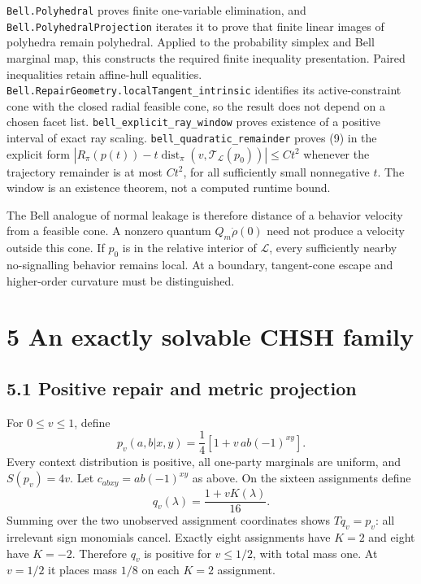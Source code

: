 \documentclass[
]{article}
\begin{document}
\texttt{Bell.Polyhedral} proves finite one-variable elimination, and \texttt{Bell.PolyhedralProjection} iterates it to prove that finite linear images of polyhedra remain polyhedral. Applied to the probability simplex and Bell marginal map, this constructs the required finite inequality presentation. Paired inequalities retain affine-hull equalities. \texttt{Bell.RepairGeometry.localTangent\_intrinsic} identifies its active-constraint cone with the closed radial feasible cone, so the result does not depend on a chosen facet list. \texttt{bell\_explicit\_ray\_window} proves existence of a positive interval of exact ray scaling. \texttt{bell\_quadratic\_remainder} proves (9) in the explicit form \(|R_\pi(p(t))-t\operatorname{dist}_\pi(v,\mathcal T_{\mathcal L}(p_0))|\le Ct^2\) whenever the trajectory remainder is at most \(Ct^2\), for all sufficiently small nonnegative \(t\). The window is an existence theorem, not a computed runtime bound.

The Bell analogue of normal leakage is therefore distance of a behavior velocity from a feasible cone. A nonzero quantum \(Q_m\dot\rho(0)\) need not produce a velocity outside this cone. If \(p_0\) is in the relative interior of \(\mathcal L\), every sufficiently nearby no-signalling behavior remains local. At a boundary, tangent-cone escape and higher-order curvature must be distinguished.

\section{5 An exactly solvable CHSH family}\label{an-exactly-solvable-chsh-family}

\subsection{5.1 Positive repair and metric projection}\label{positive-repair-and-metric-projection}

For \(0\le v\le1\), define
\[
p_v(a,b|x,y)=\frac14\left[1+v\,ab(-1)^{xy}\right].
\tag{10}
\]
Every context distribution is positive, all one-party marginals are uniform, and \(S(p_v)=4v\). Let \(c_{abxy}=ab(-1)^{xy}\) as above. On the sixteen assignments define
\[
q_v(\lambda)=\frac{1+vK(\lambda)}{16}.
\tag{11}
\]
Summing over the two unobserved assignment coordinates shows \(Tq_v=p_v\): all irrelevant sign monomials cancel. Exactly eight assignments have \(K=2\) and eight have \(K=-2\). Therefore \(q_v\) is positive for \(v\le1/2\), with total mass one. At \(v=1/2\) it places mass \(1/8\) on each \(K=2\) assignment.
\end{document}
